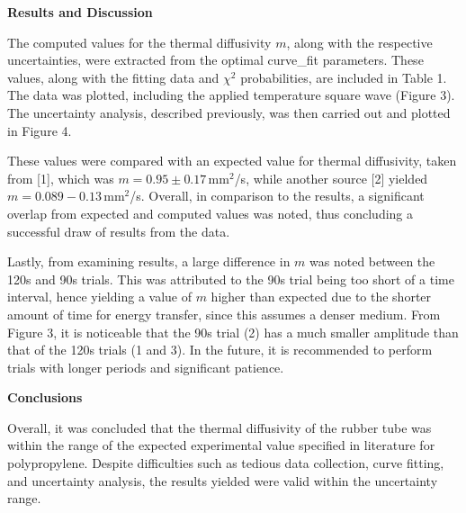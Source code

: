 \documentclass[11pt]{article}
\begin{document}
\begin{multicols}{2}
    \vspace{10pt}

     \selectfont \textbf{Results and Discussion}
    
     \selectfont The computed values for the thermal diffusivity $m$, along with the respective uncertainties, were extracted from the optimal curve\_fit parameters. These values, along with the fitting data and $\chi^2$ probabilities, are included in Table 1. The data was plotted, including the applied temperature square wave (Figure 3). The uncertainty analysis, described previously, was then carried out and plotted in Figure 4.

    These values were compared with an expected value for thermal diffusivity, taken from [1], which was $m = 0.95\pm 0.17 \,$mm$^2$/s, while another source [2] yielded\\  $m = 0.089 - 0.13\,$mm$^2$/s. Overall, in comparison to the results, a significant overlap from expected and computed values was noted, thus concluding a successful draw of results from the data. 
    
    Lastly, from examining results, a large difference in $m$ was noted between the 120s and 90s trials. This was attributed to the 90s trial being too short of a time interval, hence yielding a value of $m$ higher than expected due to the shorter amount of time for energy transfer, since this assumes a denser medium. From Figure 3, it is noticeable that the 90s trial (2) has a much smaller amplitude than that of the 120s trials (1 and 3). In the future, it is recommended to perform trials with longer periods and significant patience.   


    \vspace{10pt}

     \selectfont \textbf{Conclusions}
    
     \selectfont Overall, it was concluded that the thermal diffusivity of the rubber tube was within the range of the expected experimental value specified in literature for polypropylene. Despite difficulties such as tedious data collection, curve fitting, and uncertainty analysis, the results yielded were valid within the uncertainty range.    



\end{multicols}

    \vspace{10pt}
     
     \selectfont
\end{document}
